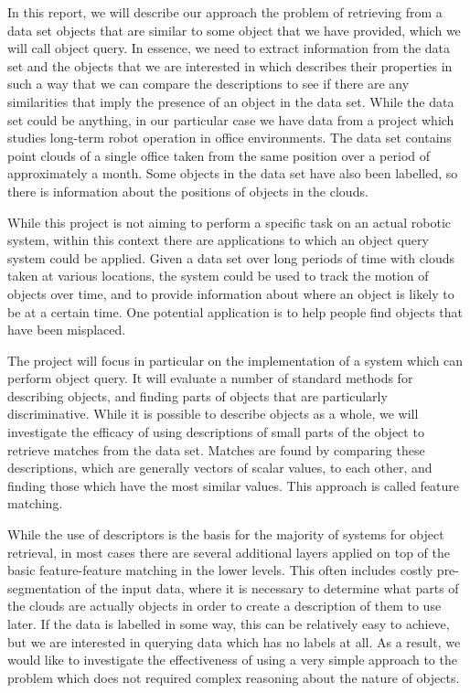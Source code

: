 \documentclass[11pt,a4paper]{kth-mag}
\begin{document}
In this report, we will describe our approach the problem of retrieving from a
data set objects that are similar to some object that we have provided, which we
will call object query. In essence, we need to extract information from the data
set and the objects that we are interested in which describes their properties
in such a way that we can compare the descriptions to see if there are any
similarities that imply the presence of an object in the data set. While the
data set could be anything, in our particular case we have data from a project
which studies long-term robot operation in office environments. The data set
contains point clouds of a single office taken from the same position over a period
of approximately a month. Some objects in the data set have also been labelled,
so there is information about the positions of objects in the clouds.

While this project is not aiming to perform a specific task on an actual robotic
system, within this context there are applications to which an object query
system could be applied. Given a data set over long periods of time with clouds
taken at various locations, the system could be used to track the motion of
objects over time, and to provide information about where an object is likely to
be at a certain time. One potential application is to help people find objects
that have been misplaced.

The project will focus in particular on the implementation of a system which can
perform object query. It will evaluate a number of standard methods for
describing objects, and finding parts of objects that are particularly
discriminative. While it is possible to describe objects as a whole, we will
investigate the efficacy of using descriptions of small parts of the object to
retrieve matches from the data set. Matches are found by comparing these
descriptions, which are generally vectors of scalar values, to each other, and
finding those which have the most similar values. This approach is called
feature matching.

While the use of descriptors is the basis for the majority of systems for object
retrieval, in most cases there are several additional layers applied on top of
the basic feature-feature matching in the lower levels. This often includes
costly pre-segmentation of the input data, where it is necessary to determine
what parts of the clouds are actually objects in order to create a description
of them to use later. If the data is labelled in some way, this can be
relatively easy to achieve, but we are interested in querying data which has no
labels at all. As a result, we would like to investigate the effectiveness of
using a very simple approach to the problem which does not required complex
reasoning about the nature of objects.
\end{document}
